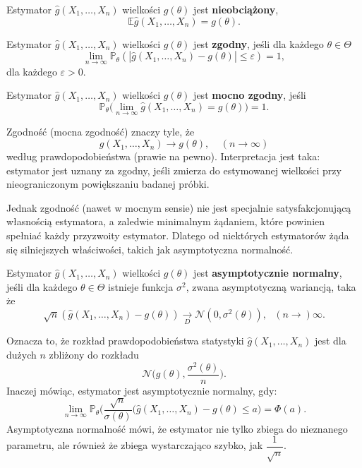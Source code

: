 \begin{definition}
Estymator $\hat{g}(X_1, \dots , X_n)$ wielkości $g(\theta)$ jest \textbf{nieobciążony},  
$$\mathbb{E}\hat{g}(X_1, \dots , X_n) = g(\theta).$$

\end{definition}

\begin{definition}
Estymator $\hat{g}(X_1, \dots , X_n)$ wielkości $g(\theta)$ jest \textbf{zgodny},
jeśli dla każdego $\theta \in \Theta$
$$ \lim\limits_{n \rightarrow \infty} \mathbb{P}_{\theta}(|\hat{g}(X_1,\dots,X_n) -g(\theta)| \leq \varepsilon ) = 1,$$
dla każdego $\varepsilon > 0.$
\end{definition}

\begin{definition}
Estymator $\hat{g}(X_1, \dots , X_n)$ wielkości $g(\theta)$ jest \textbf{mocno zgodny},
jeśli %
$$\mathbb{P}_{\theta}\Big(\lim\limits_{n \rightarrow \infty}\hat{g}(X_1,\dots,X_n)=g(\theta) \Big) = 1.$$
\end{definition}


Zgodność (mocna zgodność) znaczy tyle, że
$$\hat{g}(X_1, \dots , X_n) \rightarrow g(\theta), \ \ \ \ \ (n \rightarrow \infty)$$
według prawdopodobieństwa (prawie na pewno). Interpretacja jest taka: estymator jest uznany za
zgodny, jeśli zmierza do estymowanej wielkości przy nieograniczonym powiększaniu badanej próbki.

Jednak zgodność (nawet w mocnym sensie) nie jest specjalnie satysfakcjonującą własnością estymatora,
a zaledwie minimalnym żądaniem, które powinien spełniać każdy przyzwoity estymator. Dlatego od niektórych estymatorów żąda się silniejszych właściwości, takich jak asymptotyczna normalność.

\begin{definition}
Estymator $\hat{g}(X_1, \dots , X_n)$ wielkości $g(\theta)$ jest \textbf{asymptotycznie normalny}, jeśli dla każdego $\theta \in \Theta$ istnieje funkcja $\sigma^2$, zwana asymptotyczną wariancją, taka że
$$\sqrt{n}(\hat{g}(X_1,\dots,X_n) -g(\theta))  \underset{D}{\rightarrow} \mathcal{N}(0, \sigma^2(\theta)), \ \ \ (n \rightarrow) \infty.$$
\end{definition}

Oznacza to, że rozkład prawdopodobieństwa statystyki $\hat{g}(X_1,\dots,X_n)$ jest dla dużych $n$ zbliżony do rozkładu $$\mathcal{N}\Big(g(\theta), \dfrac{\sigma^2(\theta)}{n}\Big).$$ Inaczej mówiąc, estymator jest asymptotycznie normalny, gdy: 
$$\lim\limits_{n \rightarrow \infty} \mathbb{P}_{\theta} \Big(\dfrac{\sqrt{n}}{\sigma(\theta)}(\hat{g}(X_1,\dots,X_n) -g(\theta) \leq a \Big) = \Phi(a).$$
Asymptotyczna normalność mówi, że estymator nie tylko zbiega do nieznanego parametru, ale również że zbiega wystarczająco szybko, jak $\dfrac{1}{\sqrt{n}}$. 

